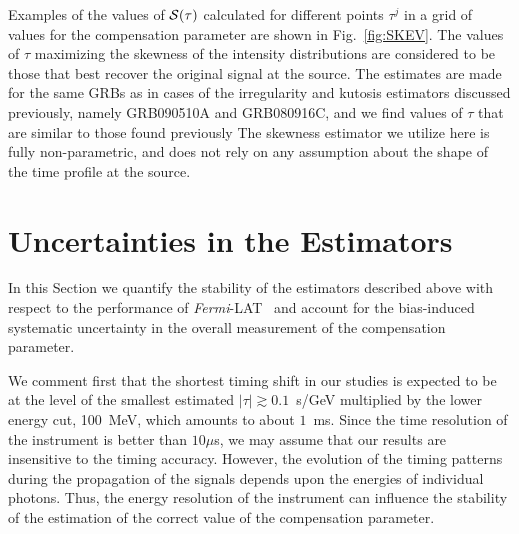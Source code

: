 \documentclass[12pt]{article}
\newcommand{\lat}{{\it Fermi}-LAT}
\begin{document}
{Examples of the values of ${\cal S(\tau )}$ calculated for different points $\tau ^j$ in a grid of values for the
compensation parameter are shown in Fig.~\ref{fig:SKEV}. The values of $\tau $ maximizing the skewness of the intensity
distributions are considered to be those that best recover the original signal at the source.
The estimates are made for the same GRBs as in cases of the irregularity and kutosis estimators discussed previously, namely
GRB090510A and GRB080916C, and we find values of $\tau $ that are similar to those found previously
{The skewness estimator we utilize here is fully non-parametric, and does not rely on any assumption
about the shape of the time profile at the source.}

\section{Uncertainties in the Estimators}
\label{sec:stab}

In this Section we quantify the stability of the estimators described above with respect to the performance of \lat~\cite{Fermi-LAT} and
account for the bias-induced systematic uncertainty in the overall measurement of the compensation parameter.

We comment first that the shortest timing shift in our studies
is expected to be at the level of the smallest estimated $|\tau |\gtrsim 0.1$~s/GeV multiplied by the lower energy cut,
100~MeV, which amounts to about $1$~ms. Since the time resolution of the instrument is better than $10\mu$s,
we may assume that our results are insensitive to the timing accuracy.
However, the  evolution of the timing patterns during the propagation of the signals depends upon the energies of individual photons.
Thus, the energy resolution of the instrument can influence the stability of the estimation of the correct value of the
compensation parameter.

}
\end{document}
